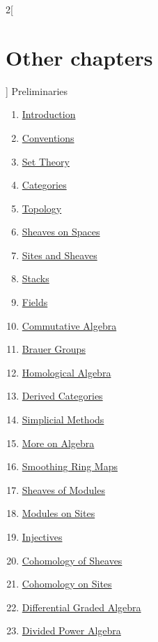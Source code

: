 \begin{multicols}{2}[\section{Other chapters}]
\noindent
Preliminaries
\begin{enumerate}
\item \hyperref[introduction-section-phantom]{Introduction}
\item \hyperref[conventions-section-phantom]{Conventions}
\item \hyperref[sets-section-phantom]{Set Theory}
\item \hyperref[categories-section-phantom]{Categories}
\item \hyperref[topology-section-phantom]{Topology}
\item \hyperref[sheaves-section-phantom]{Sheaves on Spaces}
\item \hyperref[sites-section-phantom]{Sites and Sheaves}
\item \hyperref[stacks-section-phantom]{Stacks}
\item \hyperref[fields-section-phantom]{Fields}
\item \hyperref[algebra-section-phantom]{Commutative Algebra}
\item \hyperref[brauer-section-phantom]{Brauer Groups}
\item \hyperref[homology-section-phantom]{Homological Algebra}
\item \hyperref[derived-section-phantom]{Derived Categories}
\item \hyperref[simplicial-section-phantom]{Simplicial Methods}
\item \hyperref[more-algebra-section-phantom]{More on Algebra}
\item \hyperref[smoothing-section-phantom]{Smoothing Ring Maps}
\item \hyperref[modules-section-phantom]{Sheaves of Modules}
\item \hyperref[sites-modules-section-phantom]{Modules on Sites}
\item \hyperref[injectives-section-phantom]{Injectives}
\item \hyperref[cohomology-section-phantom]{Cohomology of Sheaves}
\item \hyperref[sites-cohomology-section-phantom]{Cohomology on Sites}
\item \hyperref[dga-section-phantom]{Differential Graded Algebra}
\item \hyperref[dpa-section-phantom]{Divided Power Algebra}

\end{enumerate}
\end{multicols}
